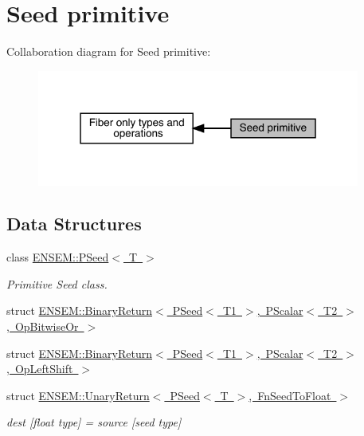 \hypertarget{group__primseed}{}\section{Seed primitive}
\label{group__primseed}
Collaboration diagram for Seed primitive\+:\nopagebreak
\begin{figure}[H]
\begin{center}
\leavevmode
\includegraphics[width=301pt]{df/d3c/group__primseed}
\end{center}
\end{figure}
\subsection*{Data Structures}
\begin{DoxyCompactItemize}
\item 
class \mbox{\hyperlink{classENSEM_1_1PSeed}{E\+N\+S\+E\+M\+::\+P\+Seed$<$ T $>$}}
\begin{DoxyCompactList}\small\item\em Primitive Seed class. \end{DoxyCompactList}\item 
struct \mbox{\hyperlink{structENSEM_1_1BinaryReturn_3_01PSeed_3_01T1_01_4_00_01PScalar_3_01T2_01_4_00_01OpBitwiseOr_01_4}{E\+N\+S\+E\+M\+::\+Binary\+Return$<$ P\+Seed$<$ T1 $>$, P\+Scalar$<$ T2 $>$, Op\+Bitwise\+Or $>$}}
\item 
struct \mbox{\hyperlink{structENSEM_1_1BinaryReturn_3_01PSeed_3_01T1_01_4_00_01PScalar_3_01T2_01_4_00_01OpLeftShift_01_4}{E\+N\+S\+E\+M\+::\+Binary\+Return$<$ P\+Seed$<$ T1 $>$, P\+Scalar$<$ T2 $>$, Op\+Left\+Shift $>$}}
\item 
struct \mbox{\hyperlink{structENSEM_1_1UnaryReturn_3_01PSeed_3_01T_01_4_00_01FnSeedToFloat_01_4}{E\+N\+S\+E\+M\+::\+Unary\+Return$<$ P\+Seed$<$ T $>$, Fn\+Seed\+To\+Float $>$}}
\begin{DoxyCompactList}\small\item\em dest \mbox{[}float type\mbox{]} = source \mbox{[}seed type\mbox{]} \end{DoxyCompactList}\end{DoxyCompactItemize}
